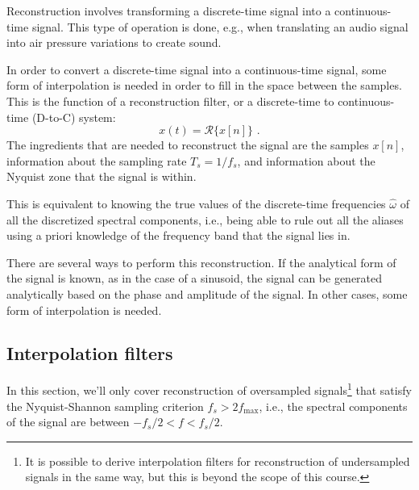 Reconstruction involves transforming a discrete-time signal into a continuous-time signal. 
This type of operation is done, e.g., when
translating an audio signal into air pressure variations to create sound.

In order to convert a discrete-time signal into a continuous-time signal, some form 
of interpolation is needed in order to fill in the space between the samples. 
This is the function of a reconstruction filter, or a discrete-time to continuous-time (D-to-C) system:
\begin{equation}
  x(t) = \mathcal{R}\{x[n]\}\,\,.
\end{equation}
The ingredients that are needed to reconstruct the signal are the samples $x[n]$, information about the
sampling rate $T_s=1/f_s$, and information about the Nyquist zone that the signal is within.

This is equivalent to knowing the true values of the discrete-time frequencies $\hat{\omega}$ of all the discretized spectral
components, i.e., being able to rule out all the aliases using a priori knowledge of the frequency band that the signal lies in.

There are several ways to perform this reconstruction. If the analytical form of the signal is 
known, as in the case of a sinusoid, the signal can be generated analytically based on the 
phase and amplitude of the signal. In other cases, some form of interpolation is needed.

\subsection{Interpolation filters}
In this section, we'll only cover reconstruction of oversampled signals\footnote{It is possible to derive interpolation filters
  for reconstruction of undersampled signals in the same way, but this is beyond the scope of this course.} that satisfy
the Nyquist-Shannon sampling criterion $f_s > 2f_{\mathrm{max}}$, i.e., 
the spectral components of the signal are between $-f_s/2 < f < f_s/2$.

